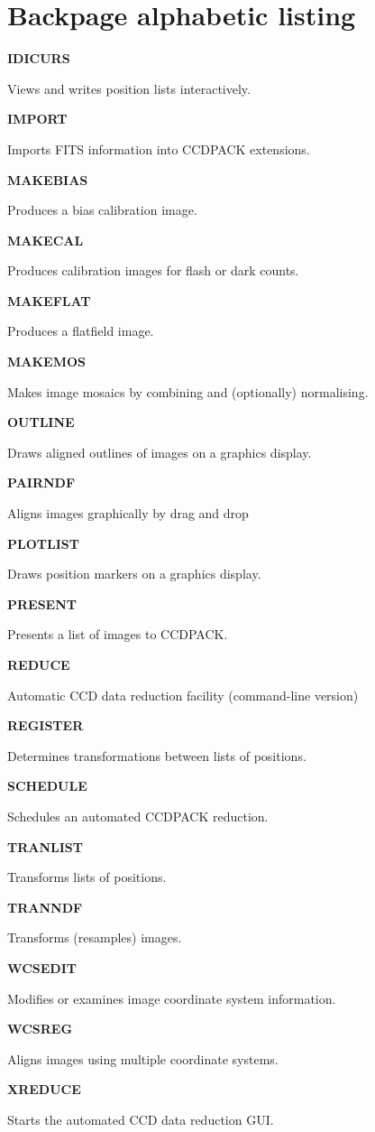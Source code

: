 \documentclass[twoside,11pt]{article}
\newenvironment{latexonly}{}{}
\renewcommand{\_}{\texttt{\symbol{95}}}
\newcommand{\quickdes}[3]{
                         \parbox{1.1in}{\bf #1}
                         \parbox{4.4in}{\raggedright #2 \dotfill}
                         \parbox{0.6in}{\pageref{#3}}
                         \vspace*{0.2in}}
\newcommand{\latexonlysection}[1]{\section{#1}}
\newcommand{\latexonlysection}[1]{#1}
\begin{document}
\begin{latexonly}

\cleardoublepage

\latexonlysection{Backpage alphabetic listing}

%
%

\quickdes{IDICURS}{Views and writes position lists interactively.}{IDICURS}

\quickdes{IMPORT}{Imports FITS information into CCDPACK extensions.}{IMPORT}

\quickdes{MAKEBIAS}{Produces a bias calibration image.}{MAKEBIAS}

\quickdes{MAKECAL}{Produces calibration images for flash or dark counts.}
                  {MAKECAL}

\quickdes{MAKEFLAT}{Produces a flatfield image.}
                   {MAKEFLAT}

\quickdes{MAKEMOS}{Makes image mosaics by combining and (optionally) 
                   normalising.}
                  {MAKEMOS}

\quickdes{OUTLINE}{Draws aligned outlines of images on a graphics display.}
                  {OUTLINE}

\quickdes{PAIRNDF}{Aligns images graphically by drag and drop}{PAIRNDF}

\quickdes{PLOTLIST}{Draws position markers on a graphics display.}
                   {PLOTLIST}

\quickdes{PRESENT}{Presents a list of images to CCDPACK.}{PRESENT}

\quickdes{REDUCE}{Automatic CCD data reduction facility (command-line version)}
                 {REDUCE}

\quickdes{REGISTER}{Determines transformations between lists of positions.}
                   {REGISTER}

\quickdes{SCHEDULE}{Schedules an automated CCDPACK reduction.}{SCHEDULE}

\quickdes{TRANLIST}{Transforms lists of positions.}
                   {TRANLIST}

\quickdes{TRANNDF}{Transforms (resamples) images.}
                  {TRANNDF}

\quickdes{WCSEDIT}{Modifies or examines image coordinate system information.}
                  {WCSEDIT}

\quickdes{WCSREG}{Aligns images using multiple coordinate systems.}
                 {WCSREG}

\quickdes{XREDUCE}{Starts the automated CCD data reduction GUI.}{XREDUCE}


\end{latexonly}
\end{document}
